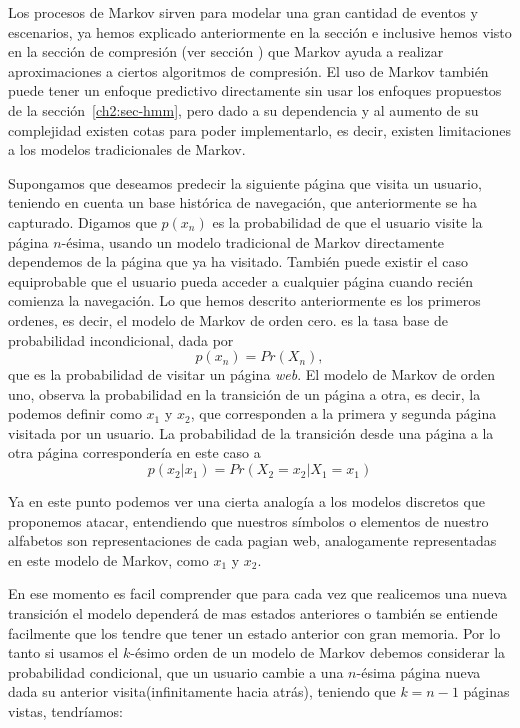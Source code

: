 
Los procesos de Markov sirven para modelar una gran cantidad de eventos y escenarios, ya hemos explicado anteriormente en la sección  e inclusive hemos visto en la sección de compresión (ver sección ) que Markov ayuda a realizar aproximaciones a ciertos algoritmos de compresión. El uso de Markov también puede tener un enfoque predictivo directamente sin usar los enfoques propuestos de la sección~\ref{ch2:sec-hmm}, pero dado a su dependencia y al aumento de su complejidad existen cotas para poder implementarlo, es decir, existen limitaciones a los modelos tradicionales de Markov.

Supongamos que deseamos predecir la siguiente página que visita un usuario, teniendo en cuenta un base histórica de navegación, que anteriormente se ha capturado. Digamos que $p(x_{n})$ es la probabilidad de que el usuario visite la página $n\mbox{-ésima}$, usando un modelo tradicional de Markov directamente dependemos de la página que ya ha visitado. También puede existir el caso equiprobable que el usuario pueda acceder a cualquier página cuando recién comienza la navegación. Lo que hemos descrito anteriormente es los primeros ordenes, es decir, el modelo de Markov de orden cero. es la tasa base de probabilidad incondicional, dada por \begin{equation}
p(x_{n}) = Pr(X_n) , \end{equation} que es la probabilidad de visitar un página \emph{web}. El  modelo de Markov de orden uno, observa la probabilidad en la transición de un página a otra, es decir, la podemos definir como  $x_{1}$ y $x_{2}$, que corresponden a la primera y segunda página visitada por un usuario. La probabilidad de la transición desde una página a la otra página correspondería en este caso a 
\begin{equation} 
p(x_{2} | x_1) = Pr(X_2 = x_{2} | X_1 = x_{1}) 
\end{equation}

Ya en este punto podemos ver una cierta analogía a los modelos discretos que proponemos atacar, entendiendo que nuestros símbolos o elementos de nuestro alfabetos son representaciones de cada pagian web, analogamente representadas en este modelo de Markov, como $x_{1}$ y $x_{2}$. 

En ese momento es facil comprender que para cada vez que realicemos una nueva transición el modelo dependerá de mas estados anteriores o también se entiende facilmente que los tendre que tener un estado anterior con gran memoria. Por lo tanto si usamos el $k$-ésimo orden de un modelo de Markov debemos considerar la probabilidad condicional, que un usuario cambie a una $n$-ésima página nueva dada su anterior visita(infinitamente hacia atrás), teniendo que $k = n -1$ páginas vistas, tendríamos:

